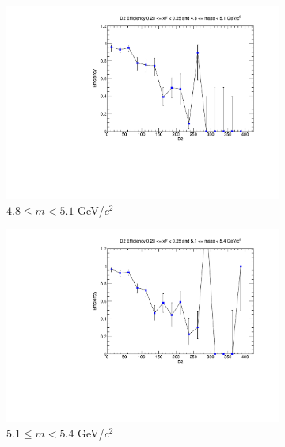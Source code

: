 \begin{figure}[p]
\begin{subfigure}[b]{0.32\textwidth}
        \centering
        \includegraphics[width=\textwidth]{./kTrackerEfficiencyPlots/D2_Efficiency_xF4_mass2.pdf}
        \caption{$4.8 \leq m < 5.1$ GeV/$c^2$}
        \label{fig:xF4_mass2}
    \end{subfigure}
    \vspace{0.5cm}
    \begin{subfigure}[b]{0.32\textwidth}
        \centering
        \includegraphics[width=\textwidth]{./kTrackerEfficiencyPlots/D2_Efficiency_xF4_mass3.pdf}
        \caption{$5.1 \leq m < 5.4$ GeV/$c^2$}
        \label{fig:xF4_mass3}
    \end{subfigure}
    \hfill
    \begin{subfigure}[b]{0.32\textwidth}
        \centering

\end{subfigure}
\end{figure}
